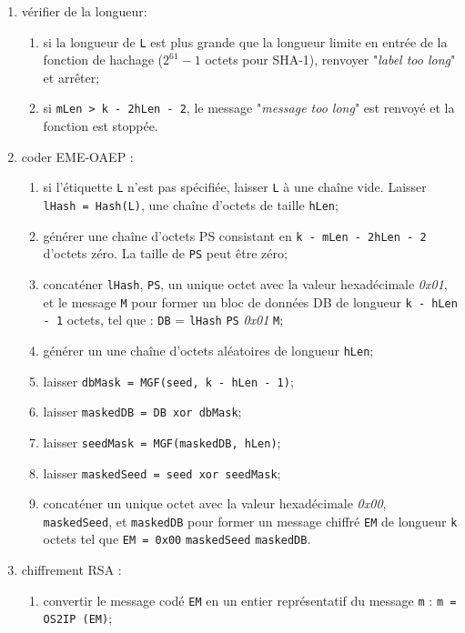 \begin{enumerate}
\item vérifier de la longueur:
\begin{enumerate}
\item si la longueur de \texttt{L} est plus grande que la longueur limite en entrée de la fonction de hachage ($2^{61} - 1$ octets pour SHA-1), renvoyer "\textit{label too long}" et arrêter;
\item si \texttt{mLen > k - 2hLen - 2}, le message "\textit{message too long}" est renvoyé et la fonction est stoppée.\\
\end{enumerate}
\item coder EME-OAEP :
\begin{enumerate}
\item si l'étiquette \texttt{L} n'est pas spécifiée, laisser \texttt{L} à une chaîne vide. Laisser \texttt{lHash = Hash(L)}, une chaîne d'octets de taille \texttt{hLen};
\item générer une chaîne d'octets PS consistant en \texttt{k - mLen - 2hLen - 2} d'octets zéro. La taille de \texttt{PS} peut être zéro;
\item concaténer \texttt{lHash}, \texttt{PS}, un unique octet avec la valeur hexadécimale \textit{0x01}, et le message \texttt{M} pour former un bloc de données DB de longueur \texttt{k - hLen - 1} octets, tel que : \texttt{DB} = \texttt{lHash} \textbar\textbar \texttt{PS} \textbar\textbar \textit{0x01} \textbar\textbar \texttt{M};
\item générer un une chaîne d'octets aléatoires de longueur \texttt{hLen};
\item laisser \texttt{dbMask = MGF(seed, k - hLen - 1)};
\item laisser \texttt{maskedDB = DB xor dbMask};
\item laisser \texttt{seedMask = MGF(maskedDB, hLen)};
\item laisser \texttt{maskedSeed = seed xor seedMask};
\item concaténer un unique octet avec la valeur hexadécimale \textit{0x00}, \texttt{maskedSeed}, et \texttt{maskedDB} pour former un message chiffré \texttt{EM} de longueur \texttt{k} octets tel que \texttt{EM = 0x00} \textbar\textbar \texttt{maskedSeed} \textbar\textbar \texttt{maskedDB}.\\
\end{enumerate}
\item chiffrement RSA :
\begin{enumerate}
\item convertir le message codé \texttt{EM} en un entier représentatif du message \texttt{m} : \texttt{m = OS2IP (EM)};

\end{enumerate}
\end{enumerate}
